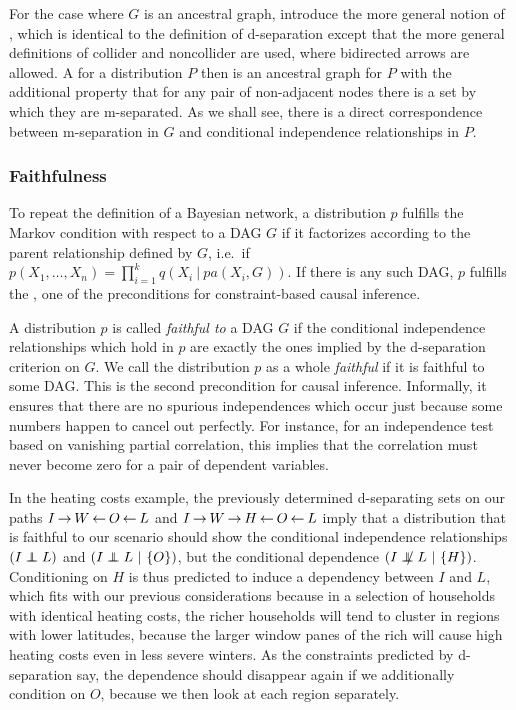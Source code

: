 For the case where $G$ is an ancestral graph, \cite{richardson_spirtes_2002} introduce the more general notion of \textit{}, which is identical to the definition of d-separation except that the more general definitions of collider and noncollider are used, where bidirected arrows are allowed. A  for a distribution $P$ then is an ancestral graph for $P$ with the additional property that for any pair of non-adjacent nodes there is a set by which they are m-separated. As we shall see, there is a direct correspondence between m-separation in $G$ and conditional independence relationships in $P$.

\subsubsection{Faithfulness}
To repeat the definition of a Bayesian network, a distribution $p$ fulfills the Markov condition with respect to a DAG $G$ if it factorizes according to the parent relationship defined by $G$, i.e.\ if $p(X_1,\dots,X_n) = \prod_{i=1}^k q(X_i\ |\ pa(X_i,G))$. If there is any such DAG, $p$ fulfills the \textit{}, one of the preconditions for constraint-based causal inference.

A distribution $p$ is called \textit{faithful to} a DAG $G$ if the conditional independence relationships which hold in $p$ are exactly the ones implied by the d-separation criterion on $G$. We call the distribution $p$ as a whole \textit{faithful} if it is faithful to some DAG. This \textit{} is the second precondition for causal inference. Informally, it ensures that there are no spurious independences which occur just because some numbers happen to cancel out perfectly. For instance, for an independence test based on vanishing partial correlation, this implies that the correlation must never become zero for a pair of dependent variables.

In the heating costs example, the previously determined d-separating sets on our paths $I \kern 2pt\hbox{$\rightarrow$}\kern 2pt W \kern 2pt\hbox{$\leftarrow$}\kern 2pt O \kern 2pt\hbox{$\leftarrow$}\kern 2pt L$ and $I \kern 2pt\hbox{$\rightarrow$}\kern 2pt W \kern 2pt\hbox{$\rightarrow$}\kern 2pt H \kern 2pt\hbox{$\leftarrow$}\kern 2pt O \kern 2pt\hbox{$\leftarrow$}\kern 2pt L$ imply that a distribution that is faithful to our scenario should show the conditional independence relationships $(I \independent L)$ and $(I \independent L\ |\ \{O\})$, but the conditional dependence $(I \notindep L\ |\ \{H\})$. Conditioning on $H$ is thus
predicted to induce a dependency between $I$ and $L$, which fits with our previous considerations because in a selection of households with identical heating costs, the richer households will tend to cluster in regions with lower latitudes, because the larger window panes of the rich will cause high heating costs even in less severe winters. As the constraints predicted by d-separation say, the dependence should disappear again if we additionally condition on $O$, because we then look at each region separately.

